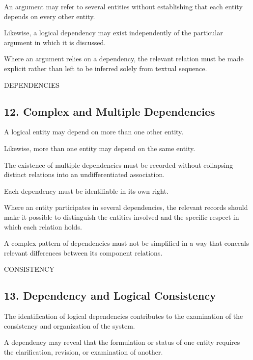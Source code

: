 An argument may refer to
several entities without
establishing that each
entity depends on every
other entity.

Likewise, a logical dependency
may exist independently
of the particular argument
in which it is discussed.

Where an argument relies
on a dependency, the relevant
relation must be made explicit
rather than left to be inferred
solely from textual sequence.

DEPENDENCIES

\subsection*{12. Complex and Multiple Dependencies}

A logical entity may depend
on more than one other entity.

Likewise, more than one
entity may depend on the
same entity.

The existence of multiple
dependencies must be recorded
without collapsing distinct
relations into an undifferentiated
association.

Each dependency must be
identifiable in its own right.

Where an entity participates
in several dependencies,
the relevant records should
make it possible to distinguish
the entities involved and
the specific respect in which
each relation holds.

A complex pattern of dependencies
must not be simplified in
a way that conceals relevant
differences between its
component relations.

CONSISTENCY

\subsection*{13. Dependency and Logical Consistency}

The identification of logical
dependencies contributes
to the examination of the
consistency and organization
of the system.

A dependency may reveal
that the formulation or
status of one entity requires
the clarification, revision,
or examination of another.

